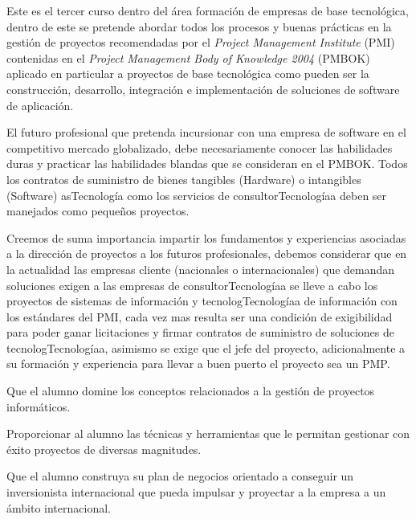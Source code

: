 \begin{syllabus}


\begin{justification}
   Este es el tercer curso dentro del área formación de empresas de base tecnológica, 
   dentro de este se pretende abordar todos los procesos y buenas prácticas en la 
   gestión de proyectos recomendadas por el \textit{Project Management Institute} (PMI) 
   contenidas en el \textit{Project Management Body of Knowledge 2004} (PMBOK)  
   aplicado en particular a proyectos de base tecnológica como pueden ser la 
   construcción, desarrollo, integración e implementación de soluciones de 
   software de aplicación.
   
   El futuro profesional que pretenda incursionar con una empresa de 
   software en el competitivo mercado globalizado, debe necesariamente 
   conocer las habilidades duras y practicar las habilidades blandas que se 
   consideran en el PMBOK. Todos los contratos de suministro de bienes 
   tangibles (Hardware) o intangibles (Software) asTecnología como los servicios de 
   consultorTecnologíaa deben ser manejados como pequeños proyectos.
   
   Creemos de suma importancia impartir los fundamentos y experiencias 
   asociadas a la dirección de proyectos a los futuros profesionales, 
   debemos considerar que en la actualidad las empresas cliente 
   (nacionales o internacionales) que demandan soluciones exigen a 
   las empresas de consultorTecnologíaa se lleve a cabo los proyectos de sistemas 
   de información y tecnologTecnologíaa de información con los estándares del PMI, 
   cada vez mas resulta ser una condición de exigibilidad para poder ganar 
   licitaciones y firmar contratos de suministro de soluciones de tecnologTecnologíaa, 
   asimismo se exige que el jefe del proyecto, adicionalmente a su formación y 
   experiencia para llevar a buen puerto el proyecto sea un PMP.
   \end{justification}
   
   \begin{goals}
   \item Que el alumno domine los conceptos relacionados a la gestión de proyectos informáticos.
   \item Proporcionar al alumno las técnicas y herramientas que le permitan gestionar con éxito proyectos de diversas magnitudes.
   \item Que el alumno construya su plan de negocios orientado a conseguir un inversionista internacional que pueda impulsar y proyectar a la empresa a un ámbito internacional.
   \end{goals}
   

\end{syllabus}
